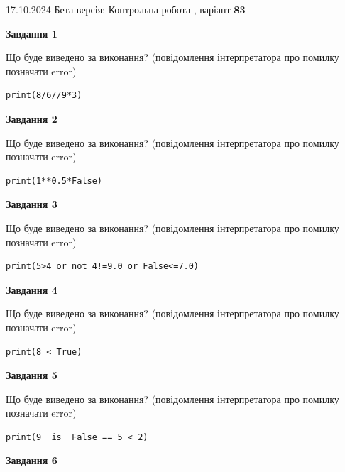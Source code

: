 \documentclass[12pt, ukrainian]{article}
\begin{document}
{\Large{17.10.2024 Бета-версія: Контрольна робота , варіант  \No \textbf { 83 }\par}}
{
\begin {large}
{\begin {center}\textbf{Завдання 1}\end {center}}

Що буде виведено за виконання? (повідомлення інтерпретатора про помилку позначати error)\par
\begin{verbatim}
print(8/6//9*3)
\end{verbatim}

{\begin {center}\textbf{Завдання 2}\end {center}}

Що буде виведено за виконання? (повідомлення інтерпретатора про помилку позначати error)\par
\begin{verbatim}
print(1**0.5*False)
\end{verbatim}

{\begin {center}\textbf{Завдання 3}\end {center}}

Що буде виведено за виконання? (повідомлення інтерпретатора про помилку позначати error)\par
\begin{verbatim}
print(5>4 or not 4!=9.0 or False<=7.0)
\end{verbatim}

{\begin {center}\textbf{Завдання 4}\end {center}}

Що буде виведено за виконання? (повідомлення інтерпретатора про помилку позначати error)\par
\begin{verbatim}
print(8 < True)
\end{verbatim}

{\begin {center}\textbf{Завдання 5}\end {center}}

Що буде виведено за виконання? (повідомлення інтерпретатора про помилку позначати error)\par
\begin{verbatim}
print(9  is  False == 5 < 2)
\end{verbatim}

{\begin {center}\textbf{Завдання 6}\end {center}}


\end{large}}
\end{document}
